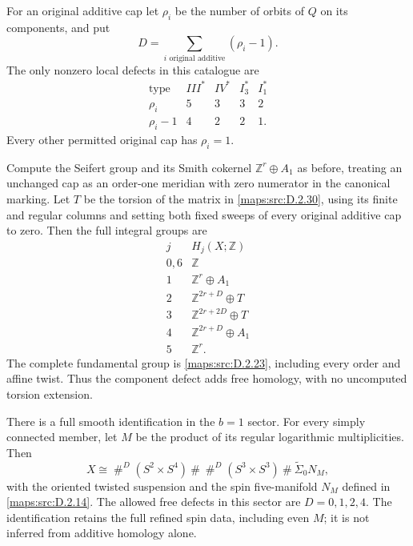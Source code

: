 \begin{theorem}
For an original additive cap let $\rho_i$ be the number of
orbits of $Q$ on its components, and put
\[
 D=\sum_{i\text{ original additive}}(\rho_i-1).
\]
The only nonzero local defects in this catalogue are
\[
\begin{array}{c|rrrr}
\text{type}&III^*&IV^*&I_3^*&I_1^*\\\hline
\rho_i&5&3&3&2\\
\rho_i-1&4&2&2&1.
\end{array}                                                   \tag{D.OD1}\label{maps:eq:D.OD1}
\]
Every other permitted original cap has $\rho_i=1$.

Compute the Seifert group and its Smith cokernel
$\mathbb Z^r\oplus A_1$ as before, treating an unchanged cap
as an order-one meridian with zero numerator in the canonical
marking. Let $T$ be the torsion of the matrix in \ref{maps:src:D.2.30},
using its finite and regular columns and setting both fixed
sweeps of every original additive cap to zero. Then the full
integral groups are
\[
\begin{array}{c|c}
j&H_j(X;\mathbb Z)\\\hline
0,6&\mathbb Z\\
1&\mathbb Z^r\oplus A_1\\
2&\mathbb Z^{2r+D}\oplus T\\
3&\mathbb Z^{2r+2D}\oplus T\\
4&\mathbb Z^{2r+D}\oplus A_1\\
5&\mathbb Z^r.
\end{array}                                                   \tag{D.OD2}\label{maps:eq:D.OD2}
\]
The complete fundamental group is \ref{maps:src:D.2.23}, including every
order and affine twist. Thus the component defect adds free
homology, with no uncomputed torsion extension.

There is a full smooth identification in the $b=1$ sector.
For every simply connected member, let $M$ be the product of
its regular logarithmic multiplicities. Then
\[
 X\cong
 \mathop{\#}^{D}(S^2\times S^4)
 \ \#\ \mathop{\#}^{D}(S^3\times S^3)
 \ \#\ \widetilde\Sigma_0 N_M,                             \tag{D.OD3}\label{maps:eq:D.OD3}
\]
with the oriented twisted suspension and the spin five-manifold
$N_M$ defined in \ref{maps:src:D.2.14}. The allowed free defects in this sector
are $D=0,1,2,4$. The identification retains the full refined
spin data, including even $M$; it is not inferred from
additive homology alone.

\end{theorem}


